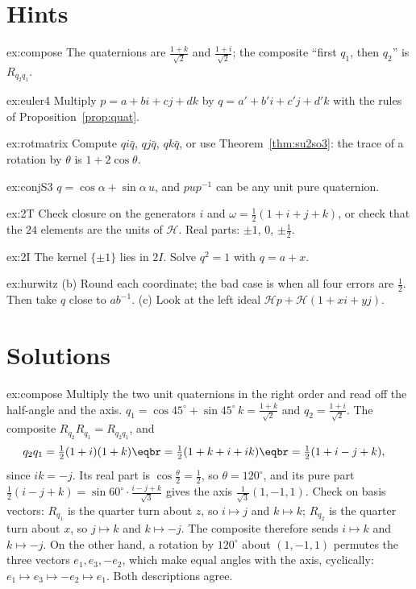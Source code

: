 \section{Hints}

\begin{hint}{ex:compose}
The quaternions are $\frac{1+k}{\sqrt2}$ and $\frac{1+i}{\sqrt2}$; the composite ``first $q_1$, then $q_2$'' is $R_{q_2q_1}$.
\end{hint}
\begin{hint}{ex:euler4}
Multiply $p=a+bi+cj+dk$ by $q=a'+b'i+c'j+d'k$ with the rules of Proposition~\ref{prop:quat}.
\end{hint}
\begin{hint}{ex:rotmatrix}
Compute $qi\bar q$, $qj\bar q$, $qk\bar q$, or use Theorem~\ref{thm:su2so3}: the trace of a rotation by $\theta$ is $1+2\cos\theta$.
\end{hint}
\begin{hint}{ex:conjS3}
$q=\cos\alpha+\sin\alpha\,u$, and $pup^{-1}$ can be any unit pure quaternion.
\end{hint}
\begin{hint}{ex:2T}
Check closure on the generators $i$ and $\omega=\frac12(1+i+j+k)$, or check that the $24$ elements are the units of $\mathcal H$. Real parts: $\pm1$, $0$, $\pm\frac12$.
\end{hint}
\begin{hint}{ex:2I}
The kernel $\{\pm1\}$ lies in $2I$. Solve $q^2=1$ with $q=a+x$.
\end{hint}
\begin{hint}{ex:hurwitz}
(b) Round each coordinate; the bad case is when all four errors are $\frac12$. Then take $q$ close to $ab^{-1}$. (c) Look at the left ideal $\mathcal Hp+\mathcal H(1+xi+yj)$.
\end{hint}

\section{Solutions}

\begin{solution}{ex:compose}
\idea Multiply the two unit quaternions in the right order and read off the half-angle and the axis.
\writeup $q_1=\cos45^\circ+\sin45^\circ\,k=\frac{1+k}{\sqrt2}$ and $q_2=\frac{1+i}{\sqrt2}$. The composite $R_{q_2}R_{q_1}=R_{q_2q_1}$, and
\[
\begin{aligned}q_2q_1&=\tfrac12(1+i)(1+k)\eqbr=\tfrac12(1+k+i+ik)\eqbr=\tfrac12(1+i-j+k),\end{aligned}
\]
since $ik=-j$. Its real part is $\cos\frac\theta2=\frac12$, so $\theta=120^\circ$, and its pure part $\frac12(i-j+k)=\sin60^\circ\cdot\frac{i-j+k}{\sqrt3}$ gives the axis $\frac1{\sqrt3}(1,-1,1)$. Check on basis vectors: $R_{q_1}$ is the quarter turn about $z$, so $i\mapsto j$ and $k\mapsto k$; $R_{q_2}$ is the quarter turn about $x$, so $j\mapsto k$ and $k\mapsto-j$. The composite therefore sends $i\mapsto k$ and $k\mapsto-j$. On the other hand, a rotation by $120^\circ$ about $(1,-1,1)$ permutes the three vectors $e_1,e_3,-e_2$, which make equal angles with the axis, cyclically: $e_1\mapsto e_3\mapsto-e_2\mapsto e_1$. Both descriptions agree.
\end{solution}


